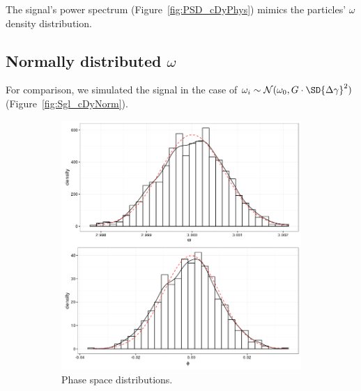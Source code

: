 \documentclass{article}
\newcommand{\Norm}{\mathcal{N}}
\begin{document}
The signal's power spectrum (Figure~\ref{fig:PSD_cDyPhys}) mimics the particles' $\omega$ density distribution.

\subsection{Normally distributed $\omega$}
For comparison, we simulated the signal in the case of $\omega_i \sim \Norm(\omega_0, \wycoef\cdot\SD{\dy}^2)$ (Figure~\ref{fig:Sgl_cDyNorm}).
\begin{figure}[h]
	\begin{subfigure}{.5\textwidth}
		\centering
		\includegraphics[scale=.5]{img/Signal/NORM_PS_dist}
		\caption{Phase space distributions.}
	\end{subfigure}~
	\begin{subfigure}{.5\textwidth}
		\centering

\end{subfigure}
\end{figure}
\end{document}
